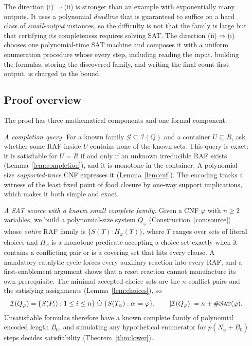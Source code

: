 \documentclass[11pt,a4paper]{article}
\theoremstyle{plain}
\theoremstyle{definition}
\theoremstyle{remark}
\newcommand{\Irr}{\mathcal I}
\newcommand{\SAT}{\textup{\textsc{Sat}}}
\newcommand{\cG}{\mathcal G}
\begin{document}
The direction (i)$\Rightarrow$(ii) is stronger than an example with exponentially many outputs. It uses a polynomial \emph{deadline} that is guaranteed to suffice on a hard class of \emph{small-output} instances, so the difficulty is not that the family is large but that certifying its completeness requires solving SAT. The direction (ii)$\Rightarrow$(i) chooses one polynomial-time SAT machine and composes it with a uniform enumeration procedure whose every step, including reading the input, building the formulas, storing the discovered family, and writing the final count-first output, is charged to the bound.

\subsection{Proof overview}

The proof has three mathematical components and one formal component.

\emph{A completion query.} For a known family $\cG\subseteq\Irr(Q)$ and a container $U\subseteq R$, ask whether some RAF inside $U$ contains none of the known sets. This query is exact: it is satisfiable for $U=R$ if and only if an unknown irreducible RAF exists (Lemma~\ref{lem:completion}), and it is monotone in the container. A polynomial-size \emph{supported-trace} CNF expresses it (Lemma~\ref{lem:cnf}). The encoding tracks a witness of the least fixed point of food closure by one-way support implications, which makes it both simple and exact.

\emph{A SAT source with a known small complete family.} Given a CNF $\varphi$ with $n\ge2$ variables, we build a polynomial-size system $Q_\varphi$ (Construction~\ref{con:source}) whose \emph{entire} RAF family is $\{S(T): H_\varphi(T)\}$, where $T$ ranges over sets of literal choices and $H_\varphi$ is a monotone predicate accepting a choice set exactly when it contains a conflicting pair or is a covering set that hits every clause. A mandatory catalytic cycle forces every auxiliary reaction into every RAF, and a first-enablement argument shows that a reset reaction cannot manufacture its own prerequisite. The minimal accepted choice sets are the $n$ conflict pairs and the satisfying assignments (Lemma~\ref{lem:choices}), so
\[
 \Irr(Q_\varphi)=\{S(P_i):1\le i\le n\}\ \dot\cup\ \{S(T_\alpha):\alpha\models\varphi\},
 \qquad |\Irr(Q_\varphi)|=n+\#\SAT(\varphi).
\]
Unsatisfiable formulas therefore have a known complete family of polynomial encoded length $B_0$, and simulating any hypothetical enumerator for $p(N_\varphi+B_0)$ steps decides satisfiability (Theorem~\ref{thm:lower}).
\end{document}
